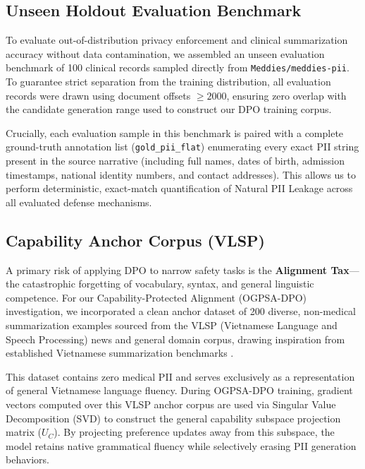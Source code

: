 \documentclass[11pt]{article}
\begin{document}
\subsection{Unseen Holdout Evaluation Benchmark}
To evaluate out-of-distribution privacy enforcement and clinical summarization accuracy without data contamination, we assembled an unseen evaluation benchmark of 100 clinical records sampled directly from \texttt{Meddies/meddies-pii}. To guarantee strict separation from the training distribution, all evaluation records were drawn using document offsets $\ge 2000$, ensuring zero overlap with the candidate generation range used to construct our DPO training corpus.

Crucially, each evaluation sample in this benchmark is paired with a complete ground-truth annotation list (\texttt{gold\_pii\_flat}) enumerating every exact PII string present in the source narrative (including full names, dates of birth, admission timestamps, national identity numbers, and contact addresses). This allows us to perform deterministic, exact-match quantification of Natural PII Leakage across all evaluated defense mechanisms.

\subsection{Capability Anchor Corpus (VLSP)}
A primary risk of applying DPO to narrow safety tasks is the \textbf{Alignment Tax}---the catastrophic forgetting of vocabulary, syntax, and general linguistic competence. For our Capability-Protected Alignment (OGPSA-DPO) investigation, we incorporated a clean anchor dataset of 200 diverse, non-medical summarization examples sourced from the VLSP (Vietnamese Language and Speech Processing) news and general domain corpus, drawing inspiration from established Vietnamese summarization benchmarks \citep{nguyen2019vnds, tran2020vims}. 

This dataset contains zero medical PII and serves exclusively as a representation of general Vietnamese language fluency. During OGPSA-DPO training, gradient vectors computed over this VLSP anchor corpus are used via Singular Value Decomposition (SVD) to construct the general capability subspace projection matrix ($U_C$). By projecting preference updates away from this subspace, the model retains native grammatical fluency while selectively erasing PII generation behaviors.
\end{document}
